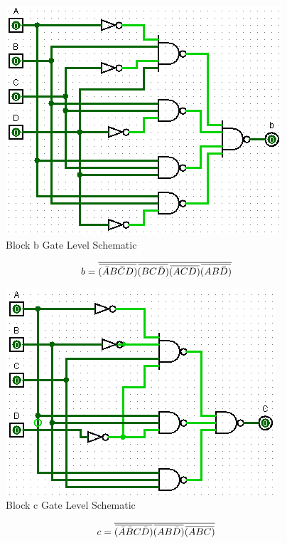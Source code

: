 \documentclass[12pt]{article}
\newcommand{\overbar}[1]{\mkern 1.5mu\overline{\mkern-1.5mu#1\mkern-1.5mu}\mkern 1.5mu} %
\begin{document}
\begin{figure}[h]
	\centering
	\label{fig:bBlockGates}
	\includegraphics[width=0.65\linewidth, keepaspectratio]{b_logicCkt}
	\caption{Block b Gate Level Schematic}
\end{figure}

\begin{equation}
	b = \overline{\overbar{(\bar{A}B\bar{C}D)}\overbar{(BC\bar{D})}\overbar{(ACD)}\overbar{(AB\bar{D})}}
\end{equation}

\begin{figure}[h]
	\centering
	\label{fig:cBlockGates}
	\includegraphics[width=0.65\linewidth, keepaspectratio]{c_logicCkt}
	\caption{Block c Gate Level Schematic}
\end{figure}

\begin{equation}
	c = \overline{\overbar{(\bar{A}\bar{B}C\bar{D})}\overbar{(AB\bar{D})}\overbar{(ABC)}}
\end{equation}
\end{document}
